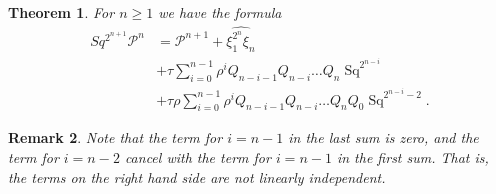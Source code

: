 \documentclass[11pt,hyp]{nyjm}
\newcommand{\PP}{\mathcal{P}}
\newcommand{\Sq}{\operatorname{Sq}}
\theoremstyle{theoremstyle}
\newtheorem{theorem}{Theorem}
\newtheorem{remark}[theorem]{Remark}
\theoremstyle{definition}
\theoremstyle{theoremstyle}
\begin{document}
\begin{theorem}
  \label{main2}
  For $n \geq 1$ we have the formula
\begin{align}
  \label{eq:qn1}
  Sq^{2^{n+1}}\PP^n &= \PP^{n+1} + \widehat{\xi_1^{2^n}\xi_n} \\
  & + \tau \sum_{i=0}^{n-1}\rho^{i}Q_{n-i-1}Q_{n-i}\dots Q_n \Sq^{2^{n-i}} \nonumber\\
  & + \tau \rho \sum_{i=0}^{n-1}\rho^{i}Q_{n-i-1}Q_{n-i}\dots Q_n Q_0 \Sq^{2^{n-i} - 2}.\nonumber
\end{align}

\end{theorem}
\begin{remark}
  Note that the term for $i = n-1$ in the last sum is zero,
  and the term for $i=n-2$ cancel with the term for $i=n-1$ in the first sum.
  That is, the terms on the right hand side are not linearly independent.
\end{remark}
\end{document}
